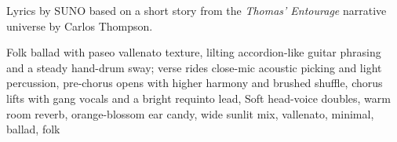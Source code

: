 
\begin{notes}
Lyrics by SUNO based on a short story from the \emph{Thomas’ Entourage} narrative universe by Carlos Thompson.
\end{notes}
\begin{style}
Folk ballad with paseo vallenato texture, lilting accordion-like guitar phrasing and a steady hand-drum sway; verse rides close-mic acoustic picking and light percussion, pre-chorus opens with higher harmony and brushed shuffle, chorus lifts with gang vocals and a bright requinto lead, Soft head-voice doubles, warm room reverb, orange-blossom ear candy, wide sunlit mix, vallenato, minimal, ballad, folk
\end{style}
